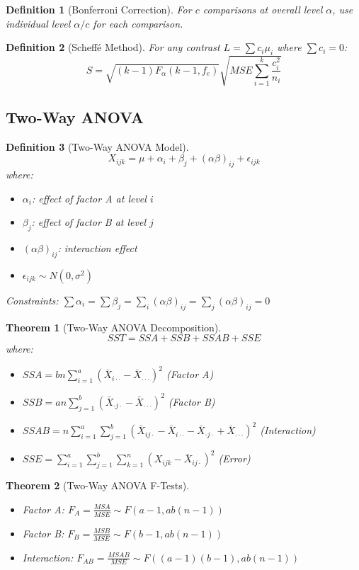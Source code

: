 \documentclass[12pt,a4paper]{amsart}
\newtheorem{theorem}{Theorem}[section]
\newtheorem{definition}{Definition}[section]
\theoremstyle{remark}
\begin{document}
\begin{definition}[Bonferroni Correction]
For $c$ comparisons at overall level $\alpha$, use individual level $\alpha/c$ for each comparison.
\end{definition}

\begin{definition}[Scheffé Method]
For any contrast $L = \sum c_i \mu_i$ where $\sum c_i = 0$:
$$S = \sqrt{(k-1)F_{\alpha}(k-1, f_e)} \sqrt{MSE \sum_{i=1}^k \frac{c_i^2}{n_i}}$$
\end{definition}

\subsection{Two-Way ANOVA}

\begin{definition}[Two-Way ANOVA Model]
$$X_{ijk} = \mu + \alpha_i + \beta_j + (\alpha\beta)_{ij} + \epsilon_{ijk}$$
where:
\begin{itemize}
\item $\alpha_i$: effect of factor A at level $i$
\item $\beta_j$: effect of factor B at level $j$  
\item $(\alpha\beta)_{ij}$: interaction effect
\item $\epsilon_{ijk} \sim N(0,\sigma^2)$
\end{itemize}
Constraints: $\sum \alpha_i = \sum \beta_j = \sum_i (\alpha\beta)_{ij} = \sum_j (\alpha\beta)_{ij} = 0$
\end{definition}

\begin{theorem}[Two-Way ANOVA Decomposition]
$$SST = SSA + SSB + SSAB + SSE$$
where:
\begin{itemize}
\item $SSA = bn \sum_{i=1}^a (\bar{X}_{i\cdot\cdot} - \bar{X}_{\cdot\cdot\cdot})^2$ (Factor A)
\item $SSB = an \sum_{j=1}^b (\bar{X}_{\cdot j\cdot} - \bar{X}_{\cdot\cdot\cdot})^2$ (Factor B)
\item $SSAB = n \sum_{i=1}^a \sum_{j=1}^b (\bar{X}_{ij\cdot} - \bar{X}_{i\cdot\cdot} - \bar{X}_{\cdot j\cdot} + \bar{X}_{\cdot\cdot\cdot})^2$ (Interaction)
\item $SSE = \sum_{i=1}^a \sum_{j=1}^b \sum_{k=1}^n (X_{ijk} - \bar{X}_{ij\cdot})^2$ (Error)
\end{itemize}
\end{theorem}

\begin{theorem}[Two-Way ANOVA F-Tests]
\begin{itemize}
\item Factor A: $F_A = \frac{MSA}{MSE} \sim F(a-1, ab(n-1))$
\item Factor B: $F_B = \frac{MSB}{MSE} \sim F(b-1, ab(n-1))$ 
\item Interaction: $F_{AB} = \frac{MSAB}{MSE} \sim F((a-1)(b-1), ab(n-1))$
\end{itemize}
\end{theorem}
\end{document}
